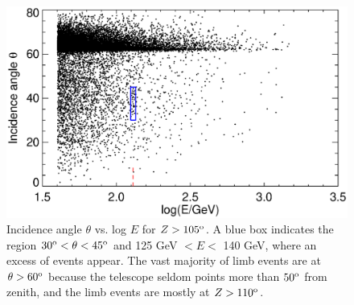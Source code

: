 \documentclass[aps,twocolumn,prd,superscriptaddress,showpacs,nofootinbib,fixfloat]{revtex4}
\newcommand{\degree}{^{\rm o}}
\begin{document}
\begin{figure}[p]
  \centering
  \includegraphics[width=1.0\linewidth]{plots/theta-E.ps}
  \caption{Incidence angle $\theta$ vs. log $E$ for $Z > 105\degree$.  A blue
  box indicates the region $30\degree < \theta < 45\degree$ and 125 GeV $< E
  <$ 140 GeV, where an excess of events appear.  The vast majority of limb
  events are at $\theta > 60\degree$ because the telescope seldom points more
  than $50\degree$ from zenith, and the limb events are mostly at
  $Z>110\degree$.}
  \label{fig:theta-E}
\end{figure}
\end{document}
